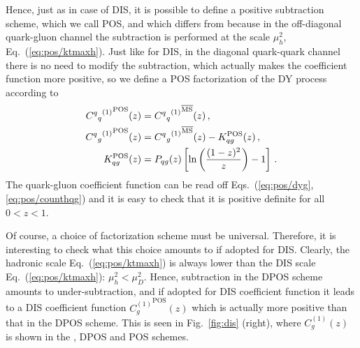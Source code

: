 Hence, just as in case of DIS, it is possible to define a positive
subtraction scheme, which we call POS, and which differs from \msbar{}
because in the off-diagonal quark-gluon channel the
subtraction is performed at the scale $\mu_h^2$,
Eq.~(\ref{eq:pos/ktmaxh}). Just like for DIS, in the diagonal quark-quark
channel there is no need to modify the \msbar{} subtraction, which
actually makes the coefficient function more positive, so we define 
a POS factorization of the DY process according to
\begin{align}\label{eq:pos/counthqq}
 {{C^q{}_q}^{(1)}}^{\textrm{POS}}(z) &=  {{C^q{}_q}^{(1)}}^{{\overline{\textrm{MS}}}}(z) \,, \\
 {{C^q{}_g}^{(1)}}^{\textrm{POS}}(z) &=  {{C^q{}_g}^{(1)}}^{{\overline{\textrm{MS}}}}(z) - K_{qg}^{\textrm{POS}} (z) \,,\\ \label{eq:pos/counthqg}
  K_{qg}^{\textrm{POS}} (z) &=  P_{qg}(z)\left[\ln\left(\frac{(1-z)^2}{z}\right) - 1\right] \,.
\end{align}
The quark-gluon coefficient function can be read off
Eqs.~(\ref{eq:pos/dyg},\ref{eq:pos/counthqg}) and it is easy to check that it
is positive definite for all $0<z<1$.

Of course, a choice of factorization scheme must be
universal. Therefore, it is interesting to check what this choice
amounts to if adopted for DIS. Clearly, the
hadronic scale Eq.~(\ref{eq:pos/ktmaxh}) is always lower than the DIS
scale Eq.~(\ref{eq:pos/ktmaxh}): $\mu_h^2< \mu_D^2$. Hence, subtraction in the
DPOS scheme amounts to under-subtraction, and if adopted for DIS
coefficient function it leads to a DIS coefficient function
${C^{(1)}_{g}}^{\textrm{POS}}(z)$ which is actually more positive than that
in the DPOS scheme. This is seen in Fig.~\ref{fig:dis} (right), where 
${C^{(1)}_{g}}(z)$ is shown in the \msbar{}, DPOS and POS schemes.

